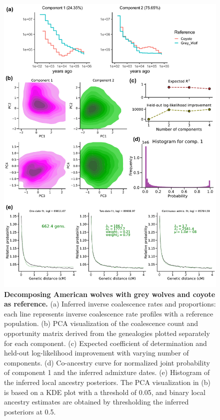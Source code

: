 \begin{figure}[h!]
    \centering
    \includegraphics[width=\linewidth]{figures/gb_sims/gb_real_wolves.pdf}
    \captionsetup{width=\textwidth+3cm}
    \caption{
    \footnotesize
    \textbf{Decomposing American wolves with grey wolves and coyote as reference.} (a) Inferred inverse coalescence rates and proportions: each line represents inverse coalescence rate profiles with a reference population. (b) PCA visualization of the coalescence count and opportunity matrix derived from the genealogies plotted separately for each component. (c) Expected coefficient of determination and held-out log-likelihood improvement with varying number of components. (d) Co-ancestry curve for normalized joint probability of component 1 and the inferred admixture dates. (e) Histogram of the inferred local ancestry posteriors. The PCA visualization in (b) is based on a KDE plot with a threshold of 0.05, and binary local ancestry estimates are obtained by thresholding the inferred posteriors at 0.5.
    }
    \label{fig:gb_real_wolves}
\end{figure}